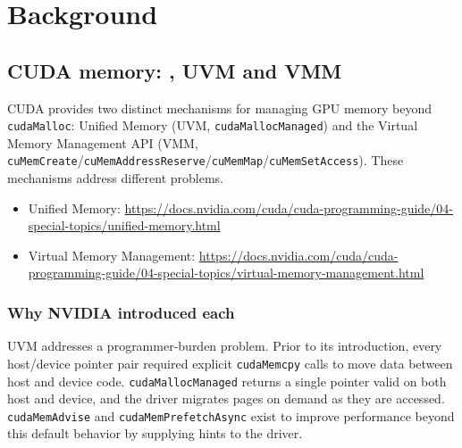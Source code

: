 \section{Background}
\label{sec:background}

\subsection{CUDA memory: , UVM and VMM}
\label{sec:bg-models}

CUDA provides two distinct mechanisms for managing GPU memory beyond
\texttt{cudaMalloc}: Unified Memory (UVM, \texttt{cudaMallocManaged}) and the
Virtual Memory Management API (VMM,
\texttt{cuMemCreate}/\texttt{cuMemAddressReserve}/\texttt{cuMemMap}/\texttt{cuMemSetAccess}).
These mechanisms address different problems.

\begin{itemize}
  \item Unified Memory:
    \url{https://docs.nvidia.com/cuda/cuda-programming-guide/04-special-topics/unified-memory.html}
  \item Virtual Memory Management:
    \url{https://docs.nvidia.com/cuda/cuda-programming-guide/04-special-topics/virtual-memory-management.html}
\end{itemize}


\subsubsection{Why NVIDIA introduced each}


UVM addresses a programmer-burden problem. Prior to its introduction, every
host/device pointer pair required explicit \texttt{cudaMemcpy} calls to move
data between host and device code. \texttt{cudaMallocManaged} returns a
single pointer valid on both host and device, and the driver migrates pages
on demand as they are accessed. \texttt{cudaMemAdvise} and
\texttt{cudaMemPrefetchAsync} exist to improve performance beyond this
default behavior by supplying hints to the driver.

